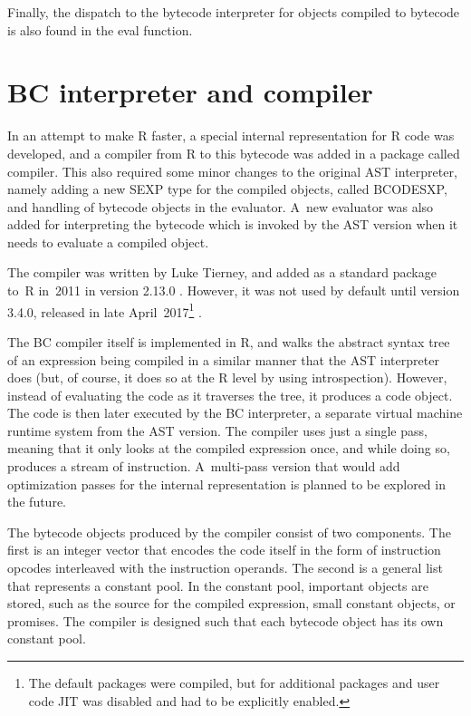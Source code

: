{Finally, the dispatch to the bytecode interpreter for objects compiled to bytecode is also found in the eval function.


\section{BC interpreter and compiler}

In an attempt to make R faster, a special internal representation for R code was developed, and a compiler from R to this bytecode was added in a package called \todo[verb]compiler. This also required some minor changes to the original AST interpreter, namely adding a new SEXP type for the compiled objects, called BCODESXP, and handling of bytecode objects in the evaluator. A~new evaluator was also added for interpreting the bytecode which is invoked by the AST version when it needs to evaluate a compiled object.

The compiler was written by Luke Tierney, and added as a standard package to~R in~2011 in version 2.13.0 \autocite{announce2011}. However, it was not used by default until version 3.4.0, released in late April~2017\footnote{The default packages were compiled, but for additional packages and user code JIT was disabled and had to be explicitly enabled.} \autocite{announce2017}.

The BC compiler itself is implemented in R, and walks the abstract syntax tree of an expression being compiled in a similar manner that the AST interpreter does (but, of course, it does so at the R level by using introspection). However, instead of evaluating the code as it traverses the tree, it produces a code object. The code is then later executed by the BC interpreter, a separate virtual machine runtime system from the AST version. The compiler uses just a single pass, meaning that it only looks at the compiled expression once, and while doing so, produces a stream of instruction. A~multi-pass version that would add optimization passes for the internal representation is planned to be explored in the future.

The bytecode objects produced by the compiler consist of two components. The first is an integer vector that encodes the code itself in the form of instruction opcodes interleaved with the instruction operands. The second is a general list that represents a constant pool. In the constant pool, important objects are stored, such as the source for the compiled expression, small constant objects, or promises. The compiler is designed such that each bytecode object has its own constant pool.

}
